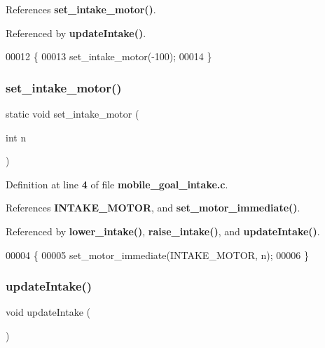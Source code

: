 References \textbf{ set\+\_\+intake\+\_\+motor()}.



Referenced by \textbf{ update\+Intake()}.


\begin{DoxyCode}
00012                            \{
00013   set_intake_motor(-100);
00014 \}
\end{DoxyCode}
\mbox{\label{mobile__goal__intake_8c_a8f215023832ba515d7b4535e3ae07498}} 
\subsubsection{set\+\_\+intake\+\_\+motor()}
{\footnotesize\ttfamily static void set\+\_\+intake\+\_\+motor (\begin{DoxyParamCaption}\item[{int}]{n }\end{DoxyParamCaption})\hspace{0.3cm}{\ttfamily [static]}}



Definition at line \textbf{ 4} of file \textbf{ mobile\+\_\+goal\+\_\+intake.\+c}.



References \textbf{ I\+N\+T\+A\+K\+E\+\_\+\+M\+O\+T\+OR}, and \textbf{ set\+\_\+motor\+\_\+immediate()}.



Referenced by \textbf{ lower\+\_\+intake()}, \textbf{ raise\+\_\+intake()}, and \textbf{ update\+Intake()}.


\begin{DoxyCode}
00004                                     \{
00005   set_motor_immediate(INTAKE_MOTOR, n);
00006 \}
\end{DoxyCode}
\mbox{\label{mobile__goal__intake_8c_ad0232c21c5c1ffda603d2b7d61034118}} 
\subsubsection{update\+Intake()}
{\footnotesize\ttfamily void update\+Intake (\begin{DoxyParamCaption}{ }\end{DoxyParamCaption})}



